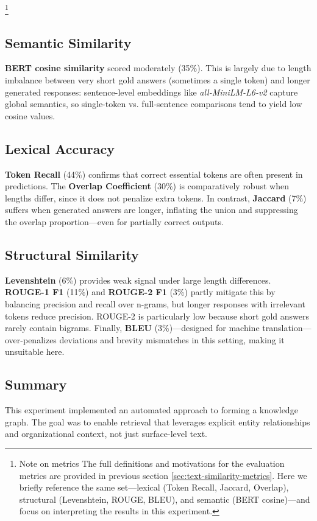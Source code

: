 \footnote{Note on metrics The full definitions and motivations for the evaluation metrics are provided in previous section \ref{sec:text-similarity-metrics}. Here we briefly reference the same set—lexical (Token Recall, Jaccard, Overlap), structural (Levenshtein, ROUGE, BLEU), and semantic (\gls{BERT} cosine)—and focus on interpreting the results in this experiment.}

\subsection{Semantic Similarity}
	\textbf{\gls{BERT} cosine similarity} scored moderately (35\%). This is largely due to length imbalance between very short gold answers (sometimes a single token) and longer generated responses: sentence-level embeddings like \textit{all-MiniLM-L6-v2} capture global semantics, so single-token vs. full-sentence comparisons tend to yield low cosine values.

\subsection{Lexical Accuracy}
	\textbf{Token Recall} (44\%) confirms that correct essential tokens are often present in predictions. The \textbf{Overlap Coefficient} (30\%) is comparatively robust when lengths differ, since it does not penalize extra tokens. In contrast, \textbf{Jaccard} (7\%) suffers when generated answers are longer, inflating the union and suppressing the overlap proportion—even for partially correct outputs.

\subsection{Structural Similarity}
	\textbf{Levenshtein} (6\%) provides weak signal under large length differences. \textbf{ROUGE-1 F1} (11\%) and \textbf{ROUGE-2 F1} (3\%) partly mitigate this by balancing precision and recall over n-grams, but longer responses with irrelevant tokens reduce precision. ROUGE-2 is particularly low because short gold answers rarely contain bigrams. Finally, \textbf{BLEU} (3\%)—designed for machine translation—over-penalizes deviations and brevity mismatches in this setting, making it unsuitable here.

\subsection{Summary}
This experiment implemented an automated approach to forming a knowledge graph. The goal was to enable retrieval that leverages explicit entity relationships and organizational context, not just surface-level text.

